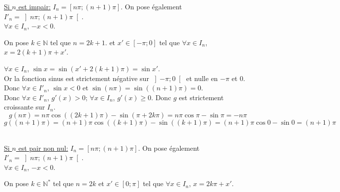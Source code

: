 \documentclass[a4paper,french,bookmarks]{article}
\begin{document}
\begin{enumerate}
\begin{enumerate}
\begin{tcolorbox}[colback=black!3,colframe=black!9,boxrule=.25pt,enhanced,arc is angular,arc=0pt]
\newline
       
    \underline{Si $n$ est impair:} $I_n = \left[n\pi; \left(n+1\right)\pi\right]$. On pose également $I'_n = \left]n\pi; \left(n+1\right)\pi\right[$.\\
    $\forall x \in I_n$, $-x < 0$.
    
    On pose $k \in \mathbb{N}$ tel que $n = 2k+1$. et $x' \in \left[-\pi; 0\right]$ tel que $\forall x \in I_n$, $x = 2\left(k+1\right)\pi + x'$.
    
    $\forall x \in I_n$, $\sin x = \sin \left(x' + 2\left(k+1\right)\pi\right) = \sin x'$.\\
    Or la fonction sinus est strictement négative sur $\left]-\pi; 0\right[$ et nulle en $-\pi$ et $0$.\\
    Donc $\forall x \in I'_n$, $\sin x < 0$ et $\sin\left(n\pi\right) = \sin\left(\left(n + 1\right)\pi\right) = 0$.\\
    Donc $\forall x \in I'_n$, $g'\left(x\right) > 0$; $\forall x \in I_n$, $g'\left(x\right) \geq 0$. Donc $g$ est strictement croissante sur $I_n$.
    \[g(n\pi)=n\pi\cos\left(\left(2k+1\right)\pi\right) - \sin \left(\pi + 2k\pi\right) = n\pi\cos \pi - \sin \pi = -n\pi\] \[g\left(\left(n+1\right)\pi\right) = \left(n+1\right)\pi\cos\left(\left(k+1\right)\pi\right) - \sin\left(\left(k+1\right)\pi\right) = \left(n+1\right)\pi\cos 0 - \sin 0 = \left(n+1\right)\pi\]\\
    \newline
    
    \underline{Si $n$ est pair non nul:} $I_n = \left[n\pi; \left(n+1\right)\pi\right]$. On pose également $I'_n = \left]n\pi; \left(n+1\right)\pi\right[$.\\
    $\forall x \in I_n$, $-x < 0$.
    
    

    On pose $k \in \mathbb{N}^*$ tel que $n = 2k$ et $x' \in \left[0; \pi\right]$ tel que $\forall x \in I_n$, $x = 2k\pi + x'$.
    

\end{tcolorbox}
\end{enumerate}
\end{enumerate}
\end{document}
